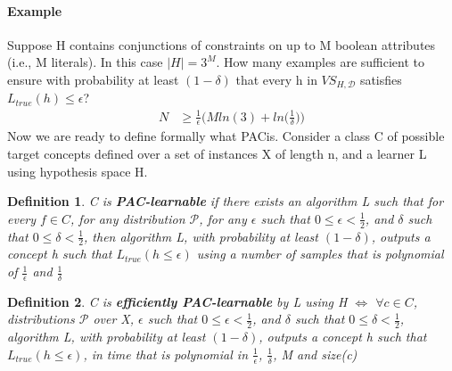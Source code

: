 \documentclass[main.tex]{subfiles}
\newtheorem{definition}{Definition}[section]
\begin{document}
\paragraph{Example} Suppose H contains conjunctions of constraints on up to M boolean attributes (i.e., M literals). In this case $|H|=3^M$. How many examples are sufficient to ensure with probability at least $(1-\delta)$ that every h in $VS_{H,\mathcal{D}}$ satisfies $L_{true}(h) \leq \epsilon$?
\begin{align*}
    N &\geq \frac{1}{\epsilon} \bigg( Mln(3) + ln \bigg( \frac{1}{\delta} \bigg) \bigg)
\end{align*}
\newline
Now we are ready to define formally what PAC\footnotemark is. Consider a class C of possible target concepts defined over a set of instances X of length n, and a learner L using hypothesis space H. 
\begin{definition}
C is \textbf{PAC-learnable} if there exists an algorithm L such that for every $f \in C$, for any distribution $\mathcal{P}$, for any $\epsilon$ such that $0 \leq \epsilon < \frac{1}{2}$, and $\delta$ such that $0 \leq \delta < \frac{1}{2}$, then algorithm L, with probability at least $(1-\delta)$, outputs a concept h such that $L_{true}(h \leq \epsilon)$ using a number of samples that is polynomial of $\frac{1}{\epsilon}$ and $\frac{1}{\delta}$
\end{definition}
\begin{definition}
C is \textbf{efficiently PAC-learnable} by L using H $\iff$ $\forall c \in C$, distributions $\mathcal{P}$ over X, $\epsilon$ such that $0 \leq \epsilon < \frac{1}{2}$, and $\delta$ such that $0 \leq \delta < \frac{1}{2}$, algorithm L, with probability at least $(1-\delta)$, outputs a concept h such that $L_{true}(h \leq \epsilon)$, in time that is polynomial in $\frac{1}{\epsilon}$, $\frac{1}{\delta}$, M and size(c)\footnotemark
\end{definition} 
\end{document}
